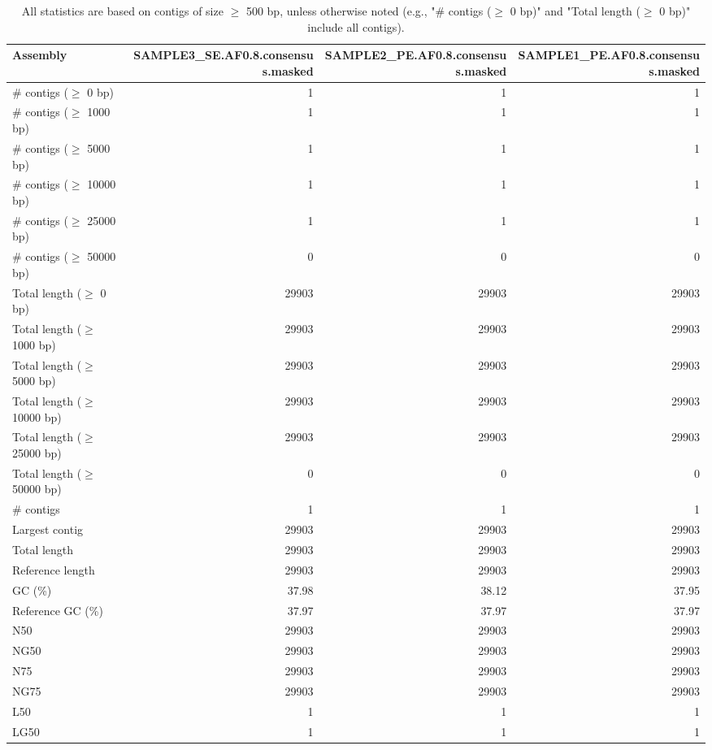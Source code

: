 \documentclass[12pt,a4paper]{article}
\begin{document}
\begin{table}[ht]
\begin{center}
\caption{All statistics are based on contigs of size $\geq$ 500 bp, unless otherwise noted (e.g., "\# contigs ($\geq$ 0 bp)" and "Total length ($\geq$ 0 bp)" include all contigs).}
\begin{tabular}{|l*{3}{|r}|}
\hline
Assembly & SAMPLE3\_SE.AF0.8.consensus.masked & SAMPLE2\_PE.AF0.8.consensus.masked & SAMPLE1\_PE.AF0.8.consensus.masked \\ \hline
\# contigs ($\geq$ 0 bp) & 1 & 1 & 1 \\ \hline
\# contigs ($\geq$ 1000 bp) & 1 & 1 & 1 \\ \hline
\# contigs ($\geq$ 5000 bp) & 1 & 1 & 1 \\ \hline
\# contigs ($\geq$ 10000 bp) & 1 & 1 & 1 \\ \hline
\# contigs ($\geq$ 25000 bp) & 1 & 1 & 1 \\ \hline
\# contigs ($\geq$ 50000 bp) & 0 & 0 & 0 \\ \hline
Total length ($\geq$ 0 bp) & 29903 & 29903 & 29903 \\ \hline
Total length ($\geq$ 1000 bp) & 29903 & 29903 & 29903 \\ \hline
Total length ($\geq$ 5000 bp) & 29903 & 29903 & 29903 \\ \hline
Total length ($\geq$ 10000 bp) & 29903 & 29903 & 29903 \\ \hline
Total length ($\geq$ 25000 bp) & 29903 & 29903 & 29903 \\ \hline
Total length ($\geq$ 50000 bp) & 0 & 0 & 0 \\ \hline
\# contigs & 1 & 1 & 1 \\ \hline
Largest contig & 29903 & 29903 & 29903 \\ \hline
Total length & 29903 & 29903 & 29903 \\ \hline
Reference length & 29903 & 29903 & 29903 \\ \hline
GC (\%) & 37.98 & 38.12 & 37.95 \\ \hline
Reference GC (\%) & 37.97 & 37.97 & 37.97 \\ \hline
N50 & 29903 & 29903 & 29903 \\ \hline
NG50 & 29903 & 29903 & 29903 \\ \hline
N75 & 29903 & 29903 & 29903 \\ \hline
NG75 & 29903 & 29903 & 29903 \\ \hline
L50 & 1 & 1 & 1 \\ \hline
LG50 & 1 & 1 & 1 \\ \hline

\end{tabular}
\end{center}
\end{table}
\end{document}
